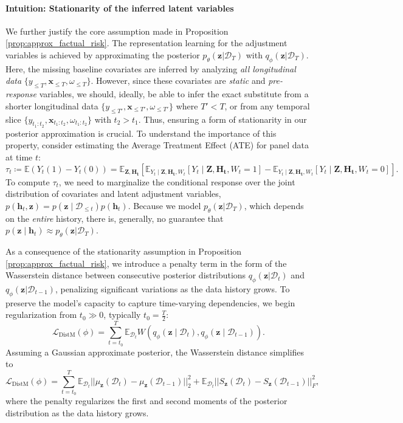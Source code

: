\documentclass[10pt]{article} %
\begin{document}
\begin{intuitionbox}
\paragraph{Intuition: Stationarity of the inferred latent variables} We further justify the core assumption made in Proposition \ref{prop:approx_factual_risk}. The representation learning for the adjustment variables is achieved by approximating the posterior \(p_{\theta}(\mathbf{z}|\mathcal{D}_T)\) with \(q_{\phi}(\mathbf{z} |\mathcal{D}_T)\). Here, the missing baseline covariates are inferred by analyzing \emph{all longitudinal data} \(\{y_{\leq T}, \mathbf{x}_{\leq T}, \omega_{\leq T}\}\). However, since these covariates are \emph{static} and \emph{pre-response} variables, we should, ideally, be able to infer the exact substitute from a shorter longitudinal data \(\{y_{\leq T'}, \mathbf{x}_{\leq T'}, \omega_{\leq T'}\}\) where \(T' < T\), or from any temporal slice \(\{y_{t_1:t_2}, \mathbf{x}_{t_1:t_2}, \omega_{t_1:t_2}\}\) with \(t_2 > t_1\). Thus, ensuring a form of stationarity in our posterior approximation is crucial. To understand the importance of this property, consider estimating the Average Treatment Effect (ATE) for panel data at time \(t\):
\[
\tau_t \coloneqq \mathbb{E}(Y_t(1)- Y_t(0)) = \mathbb{E}_{\mathbf{Z}, \mathbf{H_t}}\left[\mathbb{E}_{Y_t\mid \mathbf{Z}, \mathbf{H_t}, W_t }[Y_t\mid \mathbf{Z}, \mathbf{H_t}, W_t=1] - \mathbb{E}_{Y_t\mid \mathbf{Z}, \mathbf{H_t}, W_t }[Y_t\mid \mathbf{Z}, \mathbf{H_t}, W_t=0]\right].
\]
To compute \(\tau_t\), we need to marginalize the conditional response over the joint distribution of covariates and latent adjustment variables, \(p(\mathbf{h}_t, \mathbf{z}) = p(\mathbf{z} \mid \mathcal{D}_{\leq t}) p(\mathbf{h}_t)\). Because we model \(p_{\theta}(\mathbf{z}|\mathcal{D}_T)\), which depends on the \emph{entire} history, there is, generally, no guarantee that \( p(\mathbf{z} \mid \mathbf{h}_t ) \approx p_{\theta}(\mathbf{z}|\mathcal{D}_T) \).   
\end{intuitionbox}

As a consequence of the stationarity assumption in Proposition \ref{prop:approx_factual_risk}, we introduce a penalty term in the form of the Wasserstein distance between consecutive posterior distributions \(q_{\phi}(\mathbf{z}|\mathcal{D}_t)\) and \(q_{\phi}(\mathbf{z}|\mathcal{D}_{t-1})\), penalizing significant variations as the data history grows. To preserve the model’s capacity to capture time-varying dependencies, we begin regularization from \(t_0 \gg 0\), typically \(t_0 = \frac{T}{2}\):  
\[
\mathcal{L}_{\mathrm{DistM}}(\phi) = \sum_{t=t_0}^T \mathbb{E}_{\mathcal{D}_{t}} W(q_{\phi}(\mathbf{z} \mid \mathcal{D}_{t}), q_{\phi}(\mathbf{z} \mid \mathcal{D}_{t-1})).
\]
Assuming a Gaussian approximate posterior, the Wasserstein distance simplifies to  
\[
\mathcal{L}_{\mathrm{DistM}}(\phi) = \sum_{t=t_0}^T  \mathbb{E}_{\mathcal{D}_{t}}||\mu_{\mathbf{z}}(\mathcal{D}_{t}) - \mu_{\mathbf{z}}(\mathcal{D}_{t-1})||_2^2 + \mathbb{E}_{\mathcal{D}_{t}}||S_{\mathbf{z}}(\mathcal{D}_{t}) - S_{\mathbf{z}}(\mathcal{D}_{t-1})||^2_{F},
\]
where the penalty regularizes the first and second moments of the posterior distribution as the data history grows.  
\end{document}

